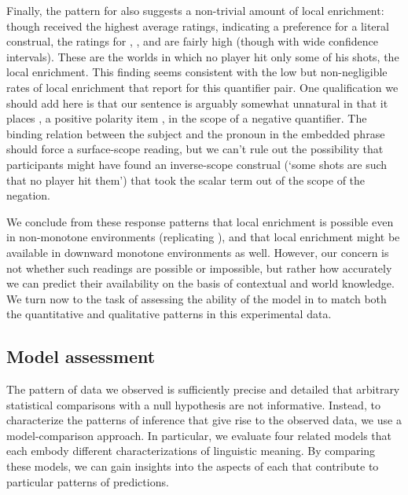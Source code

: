 \documentclass[leqno,12pt]{article}
\begin{document}
Finally, the pattern for  also suggests a non-trivial
amount of local enrichment: though  received the highest
average ratings, indicating a preference for a literal construal, the
ratings for , , and  are fairly high
(though with wide confidence intervals). These are the worlds in which
no player hit only some of his shots, the local enrichment. This
finding seems consistent with the low but non-negligible rates of
local enrichment that  report for
this quantifier pair. One qualification we should add here is that our
sentence is arguably somewhat unnatural in that it places ,
a positive polarity item \citep{Baker70,Israel96}, in the scope of a
negative quantifier. The binding relation between the subject and the
pronoun  in the embedded phrase should force a surface-scope
reading, but we can't rule out the possibility that participants might
have found an inverse-scope construal (`some shots are such that no
player hit them') that took the scalar term out of the scope of the
negation.

We conclude from these response patterns that local enrichment is
possible even in non-monotone environments (replicating
\citet{Chemla:Spector:2011}), and that local enrichment might be
available in downward monotone environments as well. However, our
concern is not whether such readings are possible or
impossible, but rather how accurately we can predict
their availability on the basis of contextual and world knowledge. 
We turn now to the task of
assessing the ability of the model in  to match
both the quantitative and qualitative patterns in this experimental
data.


\subsection{Model assessment}



The pattern of data we observed is sufficiently precise and detailed
that arbitrary statistical comparisons with a null hypothesis are
not informative. Instead, to characterize the patterns of inference
that give rise to the observed data, we use a model-comparison
approach. In particular, we evaluate four related
models that each embody different characterizations of linguistic
meaning. By comparing these models, we can gain insights into the
aspects of each that contribute to particular patterns of predictions.
\end{document}
